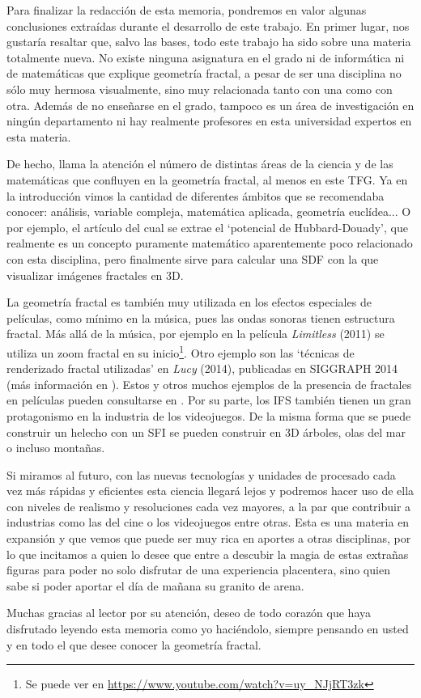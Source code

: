 %
%

Para finalizar la redacción de esta memoria, pondremos en valor algunas conclusiones extraídas durante el desarrollo de este trabajo. En primer lugar, nos gustaría resaltar que, salvo las bases, todo este trabajo ha sido sobre una materia totalmente nueva. No existe ninguna asignatura en el grado ni de informática ni de matemáticas que explique geometría fractal, a pesar de ser una disciplina no sólo muy hermosa visualmente, sino muy relacionada tanto con una como con otra. Además de no enseñarse en el grado, tampoco es un área de investigación en ningún departamento ni hay realmente profesores en esta universidad expertos en esta materia.


De hecho, llama la atención el número de distintas áreas de la ciencia y de las matemáticas que confluyen en la geometría fractal, al menos en este TFG. Ya en la introducción vimos la cantidad de diferentes ámbitos que se recomendaba conocer: análisis, variable compleja, matemática aplicada, geometría euclídea... O por ejemplo, el artículo \cite{Hubbard-Douady} del cual se extrae el `potencial de Hubbard-Douady', que realmente es un concepto puramente matemático aparentemente poco relacionado con esta disciplina, pero finalmente sirve para calcular una SDF con la que visualizar imágenes fractales en 3D.


La geometría fractal es también muy utilizada en los efectos especiales de películas, como mínimo en la música, pues las ondas sonoras tienen estructura fractal. Más allá de la música, por ejemplo en la película \textit{Limitless} (2011) se utiliza un zoom fractal en su inicio\footnote{Se puede ver en \url{https://www.youtube.com/watch?v=uy_NJjRT3zk}}. Otro ejemplo son las `técnicas de renderizado fractal utilizadas' en \textit{Lucy} (2014), publicadas en SIGGRAPH 2014 (más información en \cite{SIGGRAPH-2014}). Estos y otros muchos ejemplos de la presencia de fractales en películas pueden consultarse en \cite{fractals-films}. Por su parte, los IFS también tienen un gran protagonismo en la industria de los videojuegos. De la misma forma que se puede construir un helecho con un SFI se pueden construir en 3D árboles, olas del mar o incluso montañas. 

Si miramos al futuro, con las nuevas tecnologías y unidades de procesado cada vez más rápidas y eficientes esta ciencia llegará lejos y podremos hacer uso de ella con niveles de realismo y resoluciones cada vez mayores, a la par que contribuir a industrias como las del cine o los videojuegos entre otras. Esta es una materia en expansión y que vemos que puede ser muy rica en aportes a otras disciplinas, por lo que incitamos a quien lo desee que entre a descubir la magia de estas extrañas figuras para poder no solo disfrutar de una experiencia placentera, sino quien sabe si poder aportar el día de mañana su granito de arena.

Muchas gracias al lector por su atención, deseo de todo corazón que haya disfrutado leyendo esta memoria como yo haciéndolo, siempre pensando en usted y en todo el que desee conocer la geometría fractal. 


